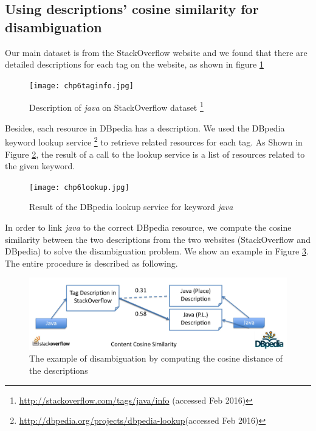\subsection{Using descriptions' cosine similarity for disambiguation}
Our main dataset is from the StackOverflow website and we found that there are detailed descriptions for each tag on the website, as shown in figure \ref{fig:chp6taginfo}
\begin{figure}[htp]
\centering
\texttt{[image: chp6taginfo.jpg]}  
\caption{Description of \textit{java} on StackOverflow dataset \footnote{\url{http://stackoverflow.com/tags/java/info} (accessed Feb 2016)}}
\label{fig:chp6taginfo} 
\end{figure}

Besides, each resource in DBpedia has a description.  We used the DBpedia keyword lookup service \footnote{\url{http://dbpedia.org/projects/dbpedia-lookup}(accessed Feb 2016)} to retrieve related resources for each tag. As Shown in Figure \ref{fig:chp6lookup}, the result of a call to the lookup service is a list of resources related to the given keyword.

\begin{figure}[htp]
\centering
\texttt{[image: chp6lookup.jpg]}  
\caption{Result of the DBpedia lookup service for keyword \textit{java}}
\label{fig:chp6lookup} 
\end{figure}

In order to link \textit{java} to the correct DBpedia resource, we compute the cosine similarity between the two descriptions from the two websites (StackOverflow and DBpedia) to solve the disambiguation problem. We show an example in Figure \ref{fig:chp6cosine}. The  entire procedure is described as following.

\begin{figure}[htp]
\centering
\includegraphics[width=5in]{chp6cosine.jpg}  
\caption{The example of disambiguation by computing the cosine distance of the descriptions }
\label{fig:chp6cosine} 
\end{figure}




